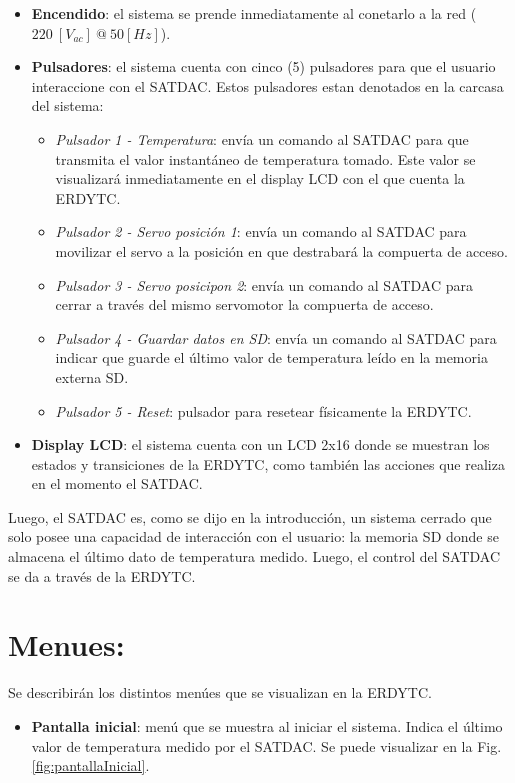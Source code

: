 \documentclass[conference]{IEEEtran}
\begin{document}
\begin{itemize}
\item \textbf{Encendido}: el sistema se prende inmediatamente al conetarlo a la red (\(220 \: [V_{ac}] \: @ \: 50 [Hz]\)).
\item \textbf{Pulsadores}: el sistema cuenta con cinco (5) pulsadores para que el usuario interaccione con el SATDAC. Estos pulsadores estan denotados en la carcasa del sistema:
\begin{itemize}
\item \emph{Pulsador 1 - Temperatura}: envía un comando al SATDAC para que transmita el valor instantáneo de temperatura tomado. Este valor se visualizará inmediatamente en el display LCD con el que cuenta la ERDYTC.
\item \emph{Pulsador 2 - Servo posición 1}: envía un comando al SATDAC para movilizar el servo a la posición en que destrabará la compuerta de acceso.
\item \emph{Pulsador 3 - Servo posicipon 2}: envía un comando al SATDAC para cerrar a través del mismo servomotor la compuerta de acceso.
\item \emph{Pulsador 4 - Guardar datos en SD}: envía un comando al SATDAC para indicar que guarde el último valor de temperatura leído en la memoria externa SD.
\item \emph{Pulsador 5 - Reset}: pulsador para resetear físicamente la ERDYTC.
\end{itemize}
\item \textbf{Display LCD}: el sistema cuenta con un LCD 2x16 donde se muestran los estados y transiciones de la ERDYTC, como también las acciones que realiza en el momento el SATDAC.
\end{itemize}

Luego, el SATDAC es, como se dijo en la introducción, un sistema cerrado que solo posee una capacidad de interacción con el usuario: la memoria SD donde se almacena el último dato de temperatura medido. Luego, el control del SATDAC se da a través de la ERDYTC.
\section{Menues:}
\label{sec:orga65730f}
Se describirán los distintos menúes que se visualizan en la ERDYTC.

\begin{itemize}
\item \textbf{Pantalla inicial}: menú que se muestra al iniciar el sistema. Indica el último valor de temperatura medido por el SATDAC. Se puede visualizar en la Fig. \ref{fig:pantallaInicial}.
\end{itemize}
\end{document}
